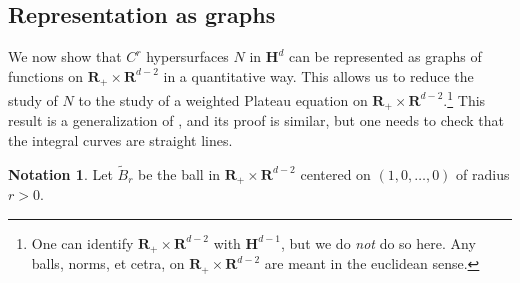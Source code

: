 \documentclass[reqno,12pt,letterpaper]{amsart}
\newcommand{\RR}{\mathbf{R}}
\newcommand{\Hyp}{\mathbf H}
\theoremstyle{definition}
\newtheorem{notation}[theorem]{Notation}
\numberwithin{equation}{section}
\begin{document}
\subsection{Representation as graphs}

We now show that $C^r$ hypersurfaces $N$ in $\Hyp^d$ can be represented as graphs of functions on $\RR_+ \times \RR^{d - 2}$ in a quantitative way.
This allows us to reduce the study of $N$ to the study of a weighted Plateau equation on $\RR_+ \times \RR^{d - 2}$.\footnote{One can identify $\RR_+ \times \RR^{d - 2}$ with $\Hyp^{d - 1}$, but we do \emph{not} do so here. Any balls, norms, et cetra, on $\RR_+ \times \RR^{d - 2}$ are meant in the euclidean sense.}
This result is a generalization of \cite[Theorem 4.8]{Giusti77}, and its proof is similar, but one needs to check that the integral curves are straight lines.

\begin{notation}
Let $\tilde B_r$ be the ball in $\RR_+ \times \RR^{d - 2}$ centered on $(1, 0, \dots, 0)$ of radius $r > 0$.
\end{notation}
\end{document}
